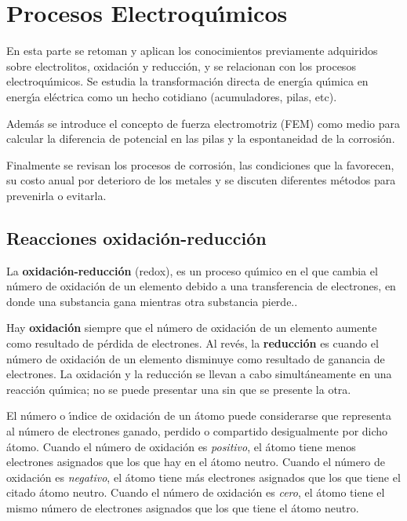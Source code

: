 \section[Procesos electroquimicos]{Procesos Electroqu\'{\i}micos}
En esta parte se retoman y aplican los conocimientos previamente adquiridos sobre  electrolitos, oxidaci\'on y reducci\'on, y  se relacionan con los procesos electroqu\'{\i}micos.  Se  estudia la transformaci\'on directa de energ\'{\i}a qu\'{\i}mica en energ\'{\i}a
el\'ectrica como un hecho cotidiano (acumuladores, pilas, etc).

Adem\'as se introduce el concepto de fuerza electromotriz (FEM) como medio para calcular la diferencia de potencial en las pilas y la espontaneidad de la corrosi\'on.

Finalmente se revisan los procesos de corrosi\'on, las condiciones que la favorecen, su
costo anual por deterioro de los metales y se discuten diferentes m\'etodos para prevenirla o evitarla.

\subsection{Reacciones oxidaci\'on-reducci\'on}
La \textbf{oxidaci\'on-reducci\'on} (redox), es un proceso  qu\'{\i}mico en el que cambia el n\'umero de oxidaci\'on de un elemento debido a una transferencia de electrones, en donde una substancia gana mientras otra substancia pierde..

Hay \textbf{oxidaci\'on} siempre que el n\'umero de  oxidaci\'on de un elemento aumente como resultado de p\'erdida de electrones. Al rev\'es, la \textbf{reducci\'on}  es cuando el n\'umero de oxidaci\'on de un elemento disminuye como resultado de ganancia de electrones. La oxidaci\'on y la reducci\'on se llevan a cabo simult\'aneamente en una reacci\'on qu\'{\i}mica; no se puede presentar una sin que se presente la otra.

El n\'umero o \'{\i}ndice de oxidaci\'on de un \'atomo puede considerarse que representa al n\'umero de electrones ganado, perdido o compartido desigualmente por dicho \'atomo. Cuando el n\'umero de oxidaci\'on es \textit{positivo}, el \'atomo tiene menos electrones asignados que los que hay en el \'atomo neutro. Cuando el n\'umero de oxidaci\'on es \textit{negativo}, el \'atomo tiene m\'as electrones asignados que los que tiene el citado \'atomo neutro. Cuando el n\'umero de oxidaci\'on  es \textit{cero}, el \'atomo tiene el mismo n\'umero de electrones asignados que los que tiene el \'atomo neutro.


